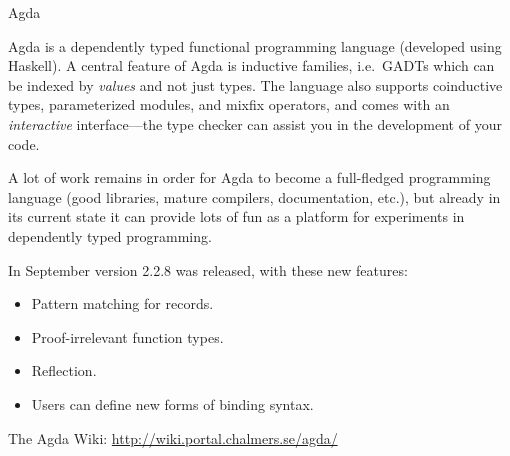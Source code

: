 \documentclass{article}
\begin{document}
\begin{hcarentry}{Agda}
\label{agda}
\makeheader

Agda is a dependently typed functional programming language (developed
using Haskell). A central feature of Agda is inductive families, i.e.\
GADTs which can be indexed by \emph{values} and not just types. The
language also supports coinductive types, parameterized modules, and
mixfix operators, and comes with an \emph{interactive} interface---the
type checker can assist you in the development of your code.

A lot of work remains in order for Agda to become a full-fledged
programming language (good libraries, mature compilers, documentation,
etc.), but already in its current state it can provide lots of fun as
a platform for experiments in dependently typed programming.

In September version 2.2.8 was released, with these new features:
\begin{itemize}
\item Pattern matching for records.
\item Proof-irrelevant function types.
\item Reflection.
\item Users can define new forms of binding syntax.
\end{itemize}

\FurtherReading
  The Agda Wiki: \url{http://wiki.portal.chalmers.se/agda/}
\end{hcarentry}
\end{document}
